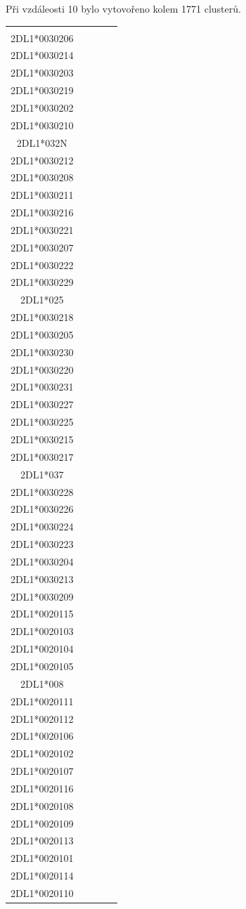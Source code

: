 \documentclass[czech,DP]{thesiskiv}
\numberwithin{equation}{section}
\begin{document}
\noindent
Při vzdáleosti 10 bylo vytovořeno kolem 1771 clusterů.
\begin{center}
\tiny
\begin{tabular}{ |c|c|c|c|c| }
\hline
	\Gape[0pt][2pt]{\makecell[tl]{\textbf{33} \\ 2DL1*0030206 \\ 2DL1*0030214 \\ 2DL1*0030203 \\ 2DL1*0030219 \\ 2DL1*0030202 \\ 2DL1*0030210 \\ 2DL1*032N \\ 2DL1*0030212 \\ 2DL1*0030208 \\ 2DL1*0030211 \\ 2DL1*0030216 \\ 2DL1*0030221 \\ 2DL1*0030207 \\ 2DL1*0030222 \\ 2DL1*0030229 \\ 2DL1*025 \\ 2DL1*0030218 \\ 2DL1*0030205 \\ 2DL1*0030230 \\ 2DL1*0030220 \\ 2DL1*0030231 \\ 2DL1*0030227 \\ 2DL1*0030225 \\ 2DL1*0030215 \\ 2DL1*0030217 \\ 2DL1*037 \\ 2DL1*0030228 \\ 2DL1*0030226 \\ 2DL1*0030224 \\ 2DL1*0030223 \\ 2DL1*0030204 \\ 2DL1*0030213 \\ 2DL1*0030209 }}
	& 
	\Gape[0pt][2pt]{\makecell[tl]{\textbf{17} \\ 2DL1*0020115 \\ 2DL1*0020103 \\ 2DL1*0020104 \\ 2DL1*0020105 \\ 2DL1*008 \\ 2DL1*0020111 \\ 2DL1*0020112 \\ 2DL1*0020106 \\ 2DL1*0020102 \\ 2DL1*0020107 \\ 2DL1*0020116 \\ 2DL1*0020108 \\ 2DL1*0020109 \\ 2DL1*0020113 \\ 2DL1*0020101 \\ 2DL1*0020114 \\ 2DL1*0020110}}

\end{tabular}
\end{center}
\end{document}
